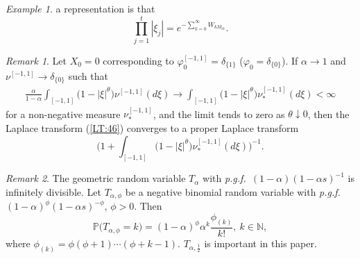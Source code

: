 \documentclass[preprint,11pt]{elsarticle}
\theoremstyle{remark}
\newtheorem{Example}{Example}
\newtheorem{Remark}{Remark}
\def\spin{{[-1,1]}}
\def\pgf{\emph{p.g.f.~}}
\begin{document}
{\begin{Example}
a representation is that
\begin{equation*}
\prod_{j=1}^t|\xi_j| = e^{-\sum_{k=0}^\infty W_{kM_{tk}}}.
\label{complicated:77}
\end{equation*}
\end{Example}
\begin{Remark}
Let $X_0=0$ corresponding to $\varphi_0^\spin = \delta_{\{1\}}$ ($\varphi_0 = \delta_{\{0\}}$). If $\alpha \to 1$ and 
$\nu^\spin \to \delta_{\{0\}}$ such that 
\begin{align*}
\frac{\alpha}{1-\alpha}\int_\spin\big (1-|\xi|^\theta\big )\nu^\spin(d\xi)
\to \int_\spin\big (1-|\xi|^\theta\big )\nu_*^\spin(d\xi) < \infty
\end{align*}
for a non-negative measure $\nu_*^\spin$, and the limit tends to zero as $\theta \downarrow 0$, then the Laplace transform (\ref{LT:46}) converges to 
a proper Laplace transform 
\begin{equation*}
\Bigg ( 1 + \int_\spin\big (1-|\xi|^\theta\big )\nu_*^\spin(d\xi)\Bigg )^{-1}.
\label{LT:46a}
\end{equation*}
\end{Remark}
%
\begin{Remark}\label{Zrandomwalk:00}
The geometric random variable $T_{\alpha}$ with \pgf $(1-\alpha)(1-\alpha s)^{-1}$ is infinitely divisible. Let $T_{\alpha,\phi}$ be a negative binomial random variable with \pgf
$(1-\alpha)^\phi(1-\alpha s)^{-\phi}$, $\phi > 0$. Then
\begin{equation*}
\mathbb{P}\big (T_{\alpha,\phi} = k\big ) = (1-\alpha)^\phi\alpha^k\frac{\phi_{(k)}}{k!},\ k\in \mathbb{N},
\label{Tid:000}
\end{equation*}
where $\phi_{(k)} = \phi(\phi+1)\cdots (\phi+k-1)$. $T_{\alpha,\frac{1}{2}}$ is important in this paper. 


\end{Remark}}
\end{document}
